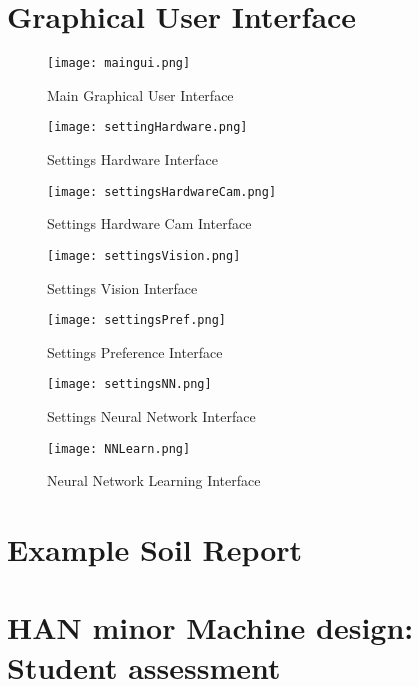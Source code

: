 \documentclass[11pt,fleqn,,a4paper,twoside,openright]{book}
\begin{document}
\cleardoublepage
{}
\setlength{\columnsep}{0.75cm}
\printindex

\appendix
{}
\chapter{Graphical User Interface}
\begin{figure}[h]
	\texttt{[image: maingui.png]}
	\caption{Main Graphical User Interface}
\end{figure}
\begin{figure}[h]
	\texttt{[image: settingHardware.png]}
	\caption{Settings Hardware Interface}
\end{figure}
\begin{figure}[h]
	\texttt{[image: settingsHardwareCam.png]}
	\caption{Settings Hardware Cam Interface}
\end{figure}
\begin{figure}[h]
	\texttt{[image: settingsVision.png]}
	\caption{Settings Vision Interface}
\end{figure}
\begin{figure}[h]
	\texttt{[image: settingsPref.png]}
	\caption{Settings Preference Interface}
\end{figure}
\begin{figure}[h]
	\texttt{[image: settingsNN.png]}
	\caption{Settings Neural Network Interface}
\end{figure}
\begin{figure}[h]
	\texttt{[image: NNLearn.png]}
	\caption{Neural Network Learning Interface}
\end{figure}

\chapter{Example Soil Report}


\chapter{HAN minor Machine design: Student assessment}\label{HAN_assignment_Machine}

\end{document}
